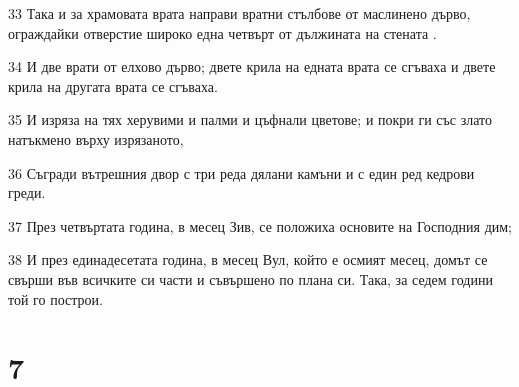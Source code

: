 \par 33 Така и за храмовата врата направи вратни стълбове от маслинено дърво, ограждайки отверстие широко една четвърт от дължината на стената .
\par 34 И две врати от елхово дърво; двете крила на едната врата се сгъваха и двете крила на другата врата се сгъваха.
\par 35 И изряза на тях херувими и палми и цъфнали цветове; и покри ги със злато натъкмено върху изрязаното,
\par 36 Съгради вътрешния двор с три реда дялани камъни и с един ред кедрови греди.
\par 37 През четвъртата година, в месец Зив, се положиха основите на Господния дим;
\par 38 И през единадесетата година, в месец Вул, който е осмият месец, домът се свърши във всичките си части и съвършено по плана си. Така, за седем години той го построи.

\chapter{7}

